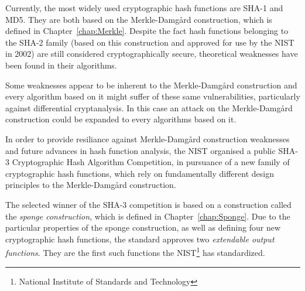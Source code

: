Currently, the most widely used cryptographic hash functions are \textsc{SHA-1} and \textsc{MD5}. They are both based on the Merkle-Damg\r{a}rd construction, which is defined in Chapter~\ref{chap:Merkle}. Despite the fact hash functions belonging to the \textsc{SHA-2} family (based on this construction and approved for use by the NIST in 2002) are still considered cryptographically secure, theoretical weaknesses have been found in their algorithms.

Some weaknesses appear to be inherent to the Merkle-Damg\r{a}rd construction and every algorithm based on it might suffer of these same vulnerabilities, particularly against differential cryptanalysis. In this case an attack on the Merkle-Damg\r{a}rd construction could be expanded to every algorithms based on it.

In order to provide resiliance against Merkle-Damg\r{a}rd construction weaknesses and future advances in hash function analysis, the NIST organised a public \textsc{SHA-3} Cryptographic Hash Algorithm Competition, in pursuance of a new family of cryptographic hash functions, which rely on fundamentally different design principles to the Merkle-Damg\r{a}rd construction.

The selected winner of the \textsc{SHA-3} competition is based on a construction called the \emph{sponge construction}, which is defined in Chapter~\ref{chap:Sponge}. Due to the particular properties of the sponge construction, as well as defining four new cryptographic hash functions, the standard approves two \emph{extendable output functions}. They are the first such functions the NIST\footnote{National Institute of Standards and Technology} has standardized.
